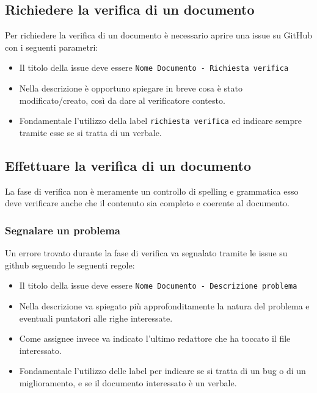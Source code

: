 \subsection{Richiedere la verifica di un documento}
Per richiedere la verifica di un documento è necessario aprire una issue su GitHub con
i seguenti parametri:
\begin{itemize}
    \item Il titolo della issue deve essere
    \texttt{Nome Documento - Richiesta verifica}
    \item Nella descrizione è opportuno spiegare in breve cosa è stato modificato/creato,
    così da dare al verificatore contesto.
    \item Fondamentale l'utilizzo della label \texttt{richiesta verifica} ed indicare
    sempre tramite esse se si tratta di un verbale.
\end{itemize}

\subsection{Effettuare la verifica di un documento}
La fase di verifica non è meramente un controllo di spelling e grammatica esso
deve verificare anche che il contenuto sia completo e coerente al documento.

\subsubsection{Segnalare un problema}
Un errore trovato durante la fase di verifica va segnalato tramite le issue su github
seguendo le seguenti regole:
\begin{itemize}
    \item Il titolo della issue deve essere
    \texttt{Nome Documento - Descrizione problema}
    \item Nella descrizione va spiegato più approfonditamente la natura del
    problema e eventuali puntatori alle righe interessate.
    \item  Come assignee invece va indicato l'ultimo redattore che ha toccato il file
    interessato.
    \item Fondamentale l'utilizzo delle label per indicare se si tratta
    di un bug o di un miglioramento, e se il documento interessato è un verbale.
\end{itemize}

